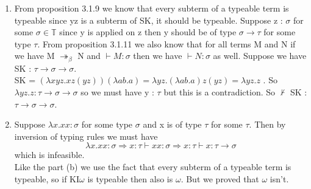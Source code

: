 \begin{enumerate}[label = \Roman*)]
\begin{enumerate}
					\\\\
					\begin{prooftree}
					\end{prooftree}
			\end{enumerate}
			\item 
			From proposition 3.1.9 we know that every subterm of a typeable term is typeable since yz is a subterm of SK, it should be typeable. Suppose z : $\sigma$ for some $\sigma \in \mathbb{T}$
			since y is applied on z then y should be of type $\sigma \rightarrow \tau$ for some type $\tau$.
				From proposition 3.1.11 we also know that for all terms M and N if we have  M $\twoheadrightarrow_{\beta}$ N and $\vdash M : \sigma$ then we have 
				$\vdash N : \sigma$ as well. Suppose we have SK : $\tau \rightarrow \sigma \rightarrow \sigma$.
				\\
				SK = $(\lambda xyz.xz(yz))(\lambda ab.a) = \lambda yz.(\lambda ab.a)z(yz) = \lambda yz.z$ . So $\lambda yz.z : \tau \rightarrow \sigma \rightarrow \sigma$ so we must have y : $\tau$ but this is a contradiction. So $\not \vdash$ SK : $\tau \rightarrow \sigma \rightarrow \sigma$.
			\item 
			Suppose $\lambda x.xx : \sigma$ for some type $\sigma$ and x is of type $\tau$ for some $\tau$. Then by inversion of typing rules we must have 
			$$ \lambda x.xx : \sigma \Rightarrow x : \tau \vdash xx : \sigma \Rightarrow x : \tau \vdash x : \tau \rightarrow \sigma$$
			which is infeasible.
			\\
			Like the part (b) we use the fact that every subterm of a typeable term is typeable, so if KI$\omega$ is typeable then also is $\omega$. But we proved that $\omega$ isn't.  
			\end{enumerate}
